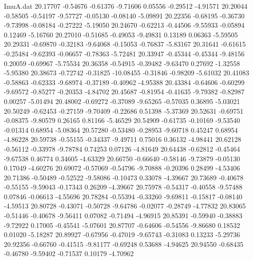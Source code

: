 \begin{filecontents}{ImuA.dat}
  20.17707   -0.54676   -0.61376   -9.71606    0.05556   -0.29512   -4.91571
  20.20044   -0.58505   -0.54197   -9.57727   -0.05130   -0.08140   -5.09891
  20.22356   -0.68195   -0.36730   -9.73998   -0.08184   -0.27222   -5.19050
  20.24670   -0.62213   -0.44506   -9.55933   -0.05894    0.12469   -5.16760
  20.27010   -0.51685   -0.49053   -9.49831    0.13189    0.06363   -5.59505
  20.29331   -0.69870   -0.32183   -9.64068   -0.15053   -0.76837   -5.83167
  20.31641   -0.61615   -0.25484   -9.62393   -0.06657   -0.78363   -5.72481
  20.33947   -0.45344   -0.45344   -9.48156    0.20059   -0.69967   -5.75534
  20.36358   -0.54915   -0.39482   -9.63470    0.27692   -1.32558   -5.95380
  20.38673   -0.72742   -0.31825  -10.08455   -0.31846   -0.98209   -5.61032
  20.41083   -0.58863   -0.62333   -9.68974   -0.37189   -0.40962   -4.95388
  20.43384   -0.64606   -0.60299   -9.69572   -0.85277   -0.20353   -4.84702
  20.45687   -0.81954   -0.41635   -9.79382   -0.82987    0.00257   -5.01494
  20.48002   -0.69272   -0.37089   -9.65265   -0.57035    0.36895   -5.03021
  20.50249   -0.62453   -0.27159   -9.70409   -0.22686    0.51398   -5.37369
  20.52631   -0.69751   -0.08375   -9.80579    0.26165    0.81166   -5.46529
  20.54909   -0.61735   -0.10169   -9.53540   -0.01314    0.68954   -5.08364
  20.57280   -0.53480   -0.28953   -9.60718    0.45247    0.68954   -4.86228
  20.59738   -0.55155   -0.34337   -9.49711    0.75016    0.36132   -4.98441
  20.62128   -0.56112   -0.33978   -9.78784    0.74253    0.07126   -4.81649
  20.64438   -0.62812   -0.45464   -9.67538    0.46774    0.34605   -4.63329
  20.66750   -0.66640   -0.58146   -9.73879   -0.05130    0.17049   -4.60276
  20.69072   -0.57069   -0.54796   -9.70888   -0.20396    0.28499   -4.53406
  20.71386   -0.50489   -0.52522   -9.58086   -0.10473    0.33078   -4.39667
  20.73689   -0.40678   -0.55155   -9.59043   -0.17343    0.26209   -4.39667
  20.75978   -0.54317   -0.40558   -9.57488    0.07846   -0.06613   -4.55696
  20.78284   -0.55394   -0.33260   -9.69811   -0.15817   -0.08140   -4.59513
  20.80728   -0.43071   -0.50728   -9.64786   -0.02077   -0.28749   -4.77832
  20.83065   -0.51446   -0.40678   -9.56411    0.07082   -0.71494   -4.96915
  20.85391   -0.59940   -0.38883   -9.72922    0.17005   -0.45541   -5.07601
  20.87707   -0.64606   -0.54556   -9.86680    0.18532    0.01020   -5.18287
  20.89927   -0.67956   -0.47019   -9.65743   -0.31083    0.13233   -5.29736
  20.92356   -0.66760   -0.41515   -9.81177   -0.69248    0.53688   -4.94625
  20.94550   -0.68435   -0.46780   -9.59402   -0.71537    0.10179   -4.70962

\end{filecontents}
